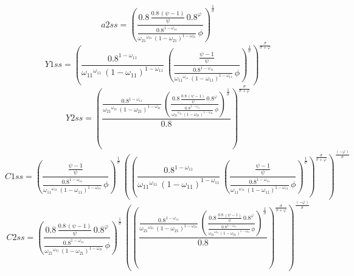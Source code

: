 \begin{dmath*}
a2ss = \left(\frac{0.8\, \frac{0.8\, \left({{\psi}}-1\right)}{{{\psi}}}\, 0.8^{{{\varphi}}}}{\frac{0.8^{1-{{\omega_{11}}}}}{{{\omega_{21}}}^{{{\omega_{21}}}}\, \left(1-{{\omega_{21}}}\right)^{1-{{\omega_{21}}}}}\, {{\phi}}}\right)^{\frac{1}{{{\sigma}}}}
\end{dmath*}
\begin{dmath*}
Y1ss = \left(\frac{0.8^{1-{{\omega_{11}}}}}{{{\omega_{11}}}^{{{\omega_{11}}}}\, \left(1-{{\omega_{11}}}\right)^{1-{{\omega_{11}}}}}\, \left(\frac{\frac{{{\psi}}-1}{{{\psi}}}}{\frac{0.8^{1-{{\omega_{11}}}}}{{{\omega_{11}}}^{{{\omega_{11}}}}\, \left(1-{{\omega_{11}}}\right)^{1-{{\omega_{11}}}}}\, {{\phi}}}\right)^{\frac{1}{{{\sigma}}}}\right)^{\frac{{{\sigma}}}{{{\sigma}}+{{\varphi}}}}
\end{dmath*}
\begin{dmath*}
Y2ss = \left(\frac{\frac{0.8^{1-{{\omega_{11}}}}}{{{\omega_{21}}}^{{{\omega_{21}}}}\, \left(1-{{\omega_{21}}}\right)^{1-{{\omega_{21}}}}}\, \left(\frac{0.8\, \frac{0.8\, \left({{\psi}}-1\right)}{{{\psi}}}\, 0.8^{{{\varphi}}}}{\frac{0.8^{1-{{\omega_{11}}}}}{{{\omega_{21}}}^{{{\omega_{21}}}}\, \left(1-{{\omega_{21}}}\right)^{1-{{\omega_{21}}}}}\, {{\phi}}}\right)^{\frac{1}{{{\sigma}}}}}{0.8}\right)^{\frac{{{\sigma}}}{{{\sigma}}+{{\varphi}}}}
\end{dmath*}
\begin{dmath*}
C1ss = \left(\frac{\frac{{{\psi}}-1}{{{\psi}}}}{\frac{0.8^{1-{{\omega_{11}}}}}{{{\omega_{11}}}^{{{\omega_{11}}}}\, \left(1-{{\omega_{11}}}\right)^{1-{{\omega_{11}}}}}\, {{\phi}}}\right)^{\frac{1}{{{\sigma}}}}\, \left(\left(\frac{0.8^{1-{{\omega_{11}}}}}{{{\omega_{11}}}^{{{\omega_{11}}}}\, \left(1-{{\omega_{11}}}\right)^{1-{{\omega_{11}}}}}\, \left(\frac{\frac{{{\psi}}-1}{{{\psi}}}}{\frac{0.8^{1-{{\omega_{11}}}}}{{{\omega_{11}}}^{{{\omega_{11}}}}\, \left(1-{{\omega_{11}}}\right)^{1-{{\omega_{11}}}}}\, {{\phi}}}\right)^{\frac{1}{{{\sigma}}}}\right)^{\frac{{{\sigma}}}{{{\sigma}}+{{\varphi}}}}\right)^{\frac{\left(-{{\varphi}}\right)}{{{\sigma}}}}
\end{dmath*}
\begin{dmath*}
C2ss = \left(\frac{0.8\, \frac{0.8\, \left({{\psi}}-1\right)}{{{\psi}}}\, 0.8^{{{\varphi}}}}{\frac{0.8^{1-{{\omega_{11}}}}}{{{\omega_{21}}}^{{{\omega_{21}}}}\, \left(1-{{\omega_{21}}}\right)^{1-{{\omega_{21}}}}}\, {{\phi}}}\right)^{\frac{1}{{{\sigma}}}}\, \left(\left(\frac{\frac{0.8^{1-{{\omega_{11}}}}}{{{\omega_{21}}}^{{{\omega_{21}}}}\, \left(1-{{\omega_{21}}}\right)^{1-{{\omega_{21}}}}}\, \left(\frac{0.8\, \frac{0.8\, \left({{\psi}}-1\right)}{{{\psi}}}\, 0.8^{{{\varphi}}}}{\frac{0.8^{1-{{\omega_{11}}}}}{{{\omega_{21}}}^{{{\omega_{21}}}}\, \left(1-{{\omega_{21}}}\right)^{1-{{\omega_{21}}}}}\, {{\phi}}}\right)^{\frac{1}{{{\sigma}}}}}{0.8}\right)^{\frac{{{\sigma}}}{{{\sigma}}+{{\varphi}}}}\right)^{\frac{\left(-{{\varphi}}\right)}{{{\sigma}}}}
\end{dmath*}
